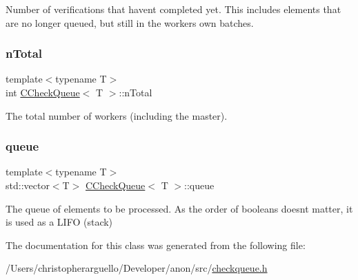 Number of verifications that haven\textquotesingle{}t completed yet. This includes elements that are no longer queued, but still in the worker\textquotesingle{}s own batches. \mbox{\label{class_c_check_queue_ab1bc74ce62477926a24bd4dd03ea5c39}} 
\subsubsection{\texorpdfstring{n\+Total}{nTotal}}
{\footnotesize\ttfamily template$<$typename T$>$ \\
int \mbox{\hyperlink{class_c_check_queue}{C\+Check\+Queue}}$<$ T $>$\+::n\+Total\hspace{0.3cm}{\ttfamily [private]}}



The total number of workers (including the master). 

\mbox{\label{class_c_check_queue_a378dfa046218f16efbb9ac6974346db5}} 
\subsubsection{\texorpdfstring{queue}{queue}}
{\footnotesize\ttfamily template$<$typename T$>$ \\
std\+::vector$<$T$>$ \mbox{\hyperlink{class_c_check_queue}{C\+Check\+Queue}}$<$ T $>$\+::queue\hspace{0.3cm}{\ttfamily [private]}}

The queue of elements to be processed. As the order of booleans doesn\textquotesingle{}t matter, it is used as a L\+I\+FO (stack) 

The documentation for this class was generated from the following file\+:\begin{DoxyCompactItemize}
\item 
/\+Users/christopherarguello/\+Developer/anon/src/\mbox{\hyperlink{checkqueue_8h}{checkqueue.\+h}}\end{DoxyCompactItemize}
